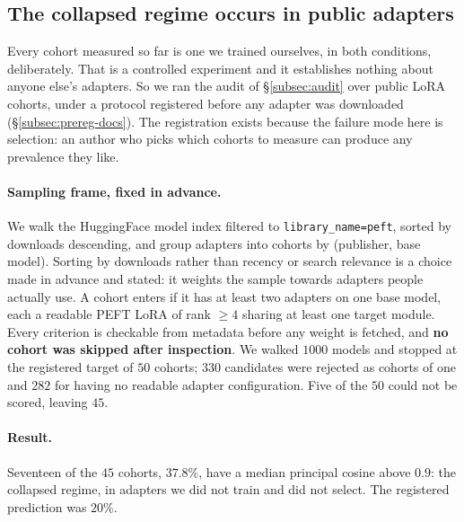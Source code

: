 \subsection{The collapsed regime occurs in public adapters}
\label{subsec:prevalence}

Every cohort measured so far is one we trained ourselves, in both conditions,
deliberately. That is a controlled experiment and it establishes nothing about
anyone else's adapters. So we ran the audit of \S\ref{subsec:audit} over public
LoRA cohorts, under a protocol registered before any adapter was downloaded
(\S\ref{subsec:prereg-docs}). The registration exists because the failure mode
here is selection: an author who picks which cohorts to measure can produce any
prevalence they like.

\paragraph{Sampling frame, fixed in advance.} We walk the HuggingFace model
index filtered to \texttt{library\_name=peft}, sorted by downloads descending,
and group adapters into cohorts by (publisher, base model). Sorting by
downloads rather than recency or search relevance is a choice made in advance
and stated: it weights the sample towards adapters people actually use. A
cohort enters if it has at least two adapters on one base model, each a
readable PEFT LoRA of rank $\geq 4$ sharing at least one target module. Every
criterion is checkable from metadata before any weight is fetched, and
\textbf{no cohort was skipped after inspection}. We walked $1000$ models and
stopped at the registered target of $50$ cohorts; $330$ candidates were
rejected as cohorts of one and $282$ for having no readable adapter
configuration. Five of the $50$ could not be scored, leaving $45$.

\paragraph{Result.} Seventeen of the $45$ cohorts, \textbf{$37.8\%$}, have a
median principal cosine above $0.9$: the collapsed regime, in adapters we did
not train and did not select. The registered prediction was $20\%$.

